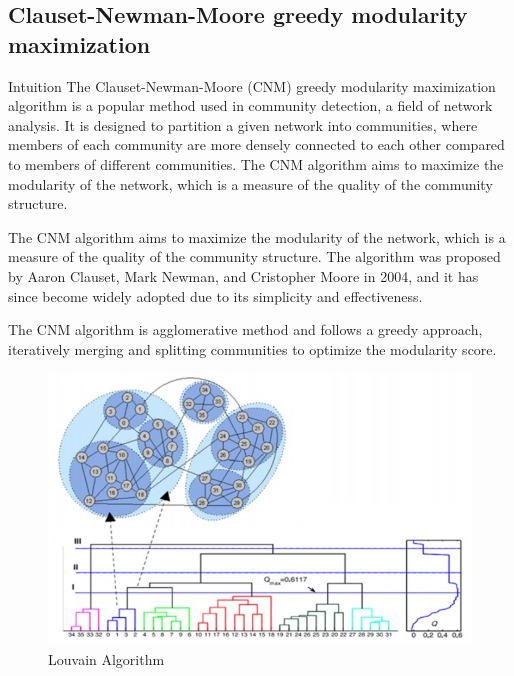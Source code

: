 \subsection{Clauset-Newman-Moore greedy modularity maximization}
\begin{frame}[fragile]{Intuition}
The Clauset-Newman-Moore (CNM) greedy modularity maximization algorithm is a popular method used in community detection, a field of network analysis. It is designed to partition a given network into communities, where members of each community are more densely connected to each other compared to members of different communities. The CNM algorithm aims to maximize the modularity of the network, which is a measure of the quality of the community structure.

The CNM algorithm aims to maximize the modularity of the network, which is a measure of the quality of the community structure. The algorithm was proposed by Aaron Clauset, Mark Newman, and Cristopher Moore in 2004, and it has since become widely adopted due to its simplicity and effectiveness.

The CNM algorithm is agglomerative method and follows a greedy approach, iteratively merging and splitting communities to optimize the modularity score.

\begin{center}
    \begin{figure}[!htp]
    \centering
    \includegraphics[width=0.7 \textwidth]{CNM.png}
    \caption{Louvain Algorithm}
    \label{subsection}
\end{figure}
\end{center}
\end{frame}
